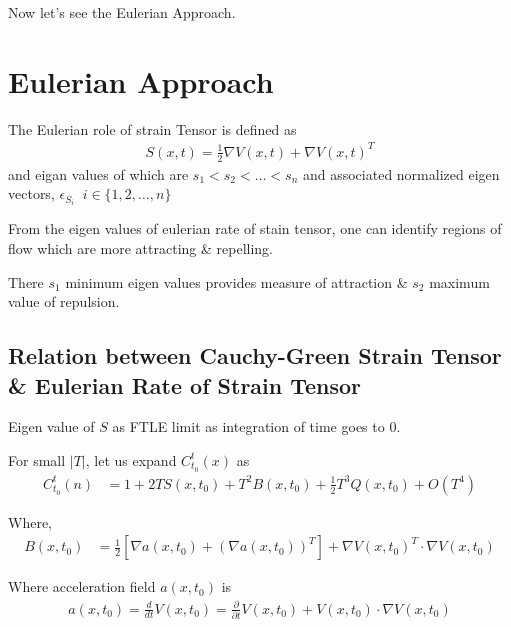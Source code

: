 \documentclass[../report.tex]{subfiles}
\begin{document}
Now let's see the Eulerian Approach. \par

\section{Eulerian Approach}
The Eulerian role of strain Tensor is defined as
\begin{equation}
  \begin{aligned}
    S(x, t) = \frac{1}{2}{\nabla V(x, t) + \nabla V(x, t)^T}
  \end{aligned}
\end{equation}
and eigan values of which are \(s_1 < s_2 < \dots < s_n\) and associated normalized eigen vectors, \(\epsilon_{S_i}\;\; i \in \{1, 2, \dots, n\}\) \par

From the eigen values of eulerian rate of stain tensor, one can identify regions of flow which are more attracting \& repelling. \par

There \(s_1\) \rightarrow minimum eigen values provides measure of attraction \& \(s_2\) maximum value of repulsion.

\subsection{Relation between Cauchy-Green Strain Tensor \& Eulerian Rate of Strain Tensor}
Eigen value of \(S\) as FTLE limit as integration of time goes to 0. \par

For small \(|T|\), let us expand  \(C_{t_0}^t (x)\) as
\begin{equation}
  \begin{aligned}
    C_{t_0}^t (n) &= 1 + 2T S(x, t_0) + T^2 B(x, t_0) + \frac{1}{2} T^3 Q(x, t_0) + O(T^4)
  \end{aligned}
\end{equation}

Where,
\begin{equation}
  \begin{aligned}
    B(x, t_0) &= \frac{1}{2}[\nabla a(x, t_0) + (\nabla a(x, t_0))^T] + \nabla V(x, t_0)^T \cdot \nabla V(x, t_0)
  \end{aligned}
\end{equation}

Where acceleration field \(a(x, t_0)\) is
\begin{equation}
  \begin{aligned}
    a(x, t_0) = \frac{d}{dt}V(x, t_0) = \frac{\partial}{\partial t} V(x, t_0) + V(x, t_0) \cdot \nabla V(x, t_0)
  \end{aligned}
\end{equation}
\end{document}
